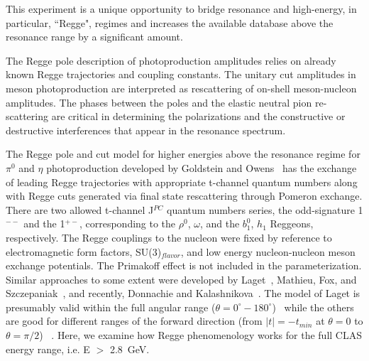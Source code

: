 \documentclass[aps,prc,twocolumn,floatfix,showpacs,preprintnumbers,amsmath,amssymb,superscriptaddress]{revtex4-1}
\begin{document}
This experiment is a unique opportunity to bridge resonance and 
high-energy, in particular, ``Regge", regimes and increases the
available database above the resonance range by a significant amount.




The Regge pole description of photoproduction amplitudes relies on 
already known Regge 
trajectories and coupling constants. The unitary cut amplitudes in meson
photoproduction are interpreted as rescattering of on-shell meson-nucleon amplitudes.  
The phases between the poles and the elastic neutral 
pion re-scattering 
are critical in determining the polarizations and the constructive or destructive interferences that appear in the resonance spectrum.

The Regge pole and cut model for higher energies above the
resonance regime for $\pi^0$ and $\eta$ photoproduction developed by Goldstein 
and Owens~\cite{Goldstein} has the exchange of leading Regge 
trajectories with appropriate t-channel quantum numbers along 
with Regge cuts generated via 
final state rescattering 
through Pomeron exchange. There are two allowed t-channel J$^{PC}$ 
quantum numbers series, the odd-signature 1$^{--}$ and the 1$^{+-}$, 
corresponding to the $\rho^0$, $\omega$, and the $b^0_1$, $h_1$ 
Reggeons, respectively. The Regge couplings to the nucleon were fixed by 
reference to electromagnetic form factors, SU(3)$_{flavor}$, and low 
energy nucleon-nucleon meson exchange potentials.  The Primakoff 
effect is not included in the parameterization.  Similar approaches 
to some extent were developed by Laget~\cite{Laget}, Mathieu, 
Fox, and Szczepaniak~\cite{Mathieu}, and recently, Donnachie and 
Kalashnikova~\cite{Donnachie}.  
The model of Laget is presumably 
valid within the full angular range ($\theta = 
0^\circ - 180^\circ$)~\cite{Laget} while the others are 
good for different ranges of the forward direction (from $|t| = 
-t_{min}$ at $\theta=0$ to $\theta=\pi/2$)
~\cite{Goldstein,Mathieu,Donnachie}. Here, we examine
how Regge phenomenology works for the full CLAS energy range, i.e.
E $>$ 2.8~GeV.
\end{document}
